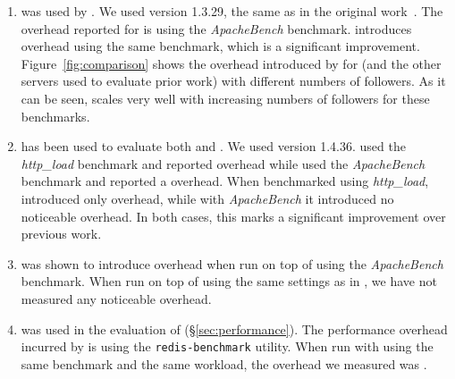 \begin{enumerate}

\item[\httpd\footnote{\url{https://httpd.apache.org/}}]
was used by \orchestra.  We used version 1.3.29, the same as in the
original work~\cite{orchestra09}.  The overhead reported for
\orchestra is \orchestraHttpd using the \emph{ApacheBench}
benchmark. \varan introduces \httpdAbOneFollower overhead using the
same benchmark, which is a significant improvement.
Figure~\ref{fig:comparison} shows the overhead introduced by \varan
for \httpd (and the other servers used to evaluate prior work) with
different numbers of followers.  As it can be seen, \varan scales very
well with increasing numbers of followers for these benchmarks.


\item[\lighttpd\footnote{\url{http://www.lighttpd.net/}}]
has been used to evaluate both \mx and \tachyon.  We used version
1.4.36. %
\mx used the \emph{http\_load} benchmark and reported \mxLighttpd overhead
while \tachyon used the \emph{ApacheBench} benchmark and reported a
\tachyonLighttpd overhead.  When benchmarked using \emph{http\_load},
\varan introduced only \lighttpdHttploadOneFollower overhead, while with
\emph{ApacheBench} it introduced no noticeable
overhead. %
In both
cases, this marks a significant improvement over previous work.

\item[\thttpd\footnote{\url{http://www.acme.com/software/thttpd/}}]
was shown to introduce \tachyonThttpd overhead when run on top of
\tachyon using the \emph{ApacheBench} benchmark. When run on top of
\varan using the same settings as in \cite{tachyon12}, we have not
measured any noticeable overhead.

\item[\redis 1.3.8\footnote{\url{http://redis.io/}}]
  was used in the evaluation of \mx (\S\ref{sec:performance}).  The performance
  overhead incurred by \mx is \mxRedis using the \lstinline`redis-benchmark`
  utility. When run with \varan using the same benchmark and the same workload,
  the overhead we measured was \redisOneFollower.


\end{enumerate}
